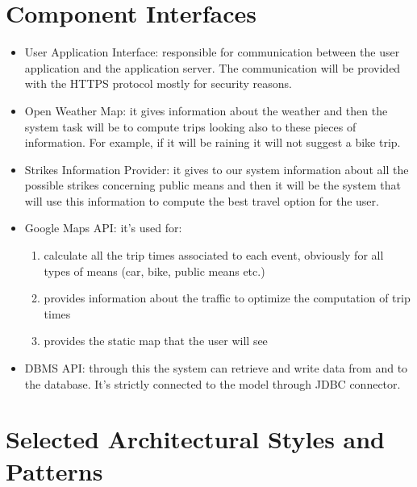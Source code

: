 \section{Component Interfaces}
\begin{itemize}
\item	User Application Interface: responsible for communication between the user application and the application server. The communication will be provided with the HTTPS protocol mostly for security reasons.
\item	Open Weather Map: it gives information about the weather and then the system task will be to compute trips looking also to these pieces of information. For example, if it will be raining it will not suggest a bike trip.
\item	Strikes Information Provider: it gives to our system information about all the possible strikes concerning public means and then it will be the system that will use this information to compute the best travel option for the user.
\item	Google Maps API: it’s used for:
\begin{enumerate}
\item	calculate all the trip times associated to each event, obviously for all types of means (car, bike, public means etc.)
\item	provides information about the traffic to optimize the computation of trip times
\item	provides the static map that the user will see
\end{enumerate}
\item	DBMS API: through this the system can retrieve and write data from and to the database. It’s strictly connected to the model through JDBC connector.
\end{itemize}
%
%
\section{Selected Architectural Styles and Patterns}

